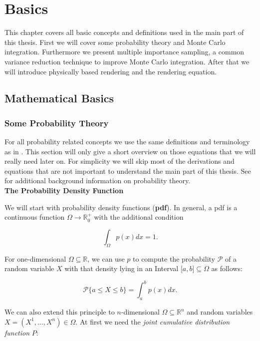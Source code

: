 \chapter{Basics}
\label{chapterBasics}

This chapter covers all basic concepts and definitions used in the main part of this thesis. First we will cover some probability theory and Monte Carlo integration. Furthermore we present multiple importance sampling, a common variance reduction technique to improve Monte Carlo integration. After that we will introduce physically based rendering and the rendering equation.

\section{Mathematical Basics}
\subsection{Some Probability Theory}

For all probability related concepts we use the same definitions and terminology as in \cite{veachdiss}. This section will only give a short overview on those equations that we will really need later on. For simplicity we will skip most of the derivations and equations that are not important to understand the main part of this thesis. See \cite[chapter 2.3]{veachdiss} for additional background information on probability theory.\\

\textbf{The Probability Density Function}

We will start with probability density functions (\textbf{pdf}). In general, a pdf is a continuous function $\Omega \rightarrow \mathbb{R}^+_0$ with the additional condition

\begin{equation}
\label{int_eins}
\int_\Omega p(x) dx = 1.
\end{equation}

For one-dimensional $\Omega \subseteq \mathbb{R}$, we can use $p$ to compute the probability $\mathcal{P}$ of a random variable $X$ with that density lying in an Interval $\lbrack a,b\rbrack \subseteq \Omega$ as follows:

\begin{equation*}
\mathcal{P}\{a \leq X \leq b\} = \int _a^b p(x) dx.
\end{equation*}

We can also extend this principle to $n$-dimensional $\Omega \subseteq \mathbb{R}^n$ and random variables \\$X=(X^1, \dots, X^n) \in \Omega$. At first we need the \emph{joint cumulative distribution function} $P$:

